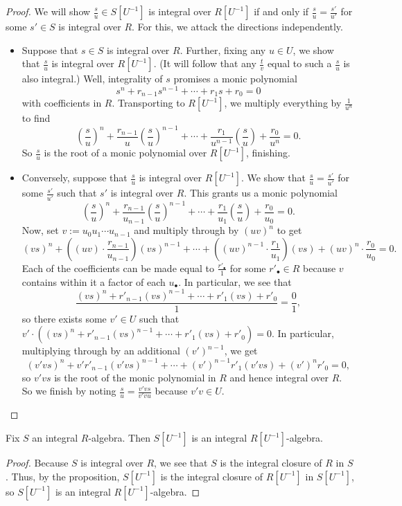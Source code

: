 \begin{proof}
	We will show $\frac su\in S\left[U^{-1}\right]$ is integral over $R\left[U^{-1}\right]$ if and only if $\frac su=\frac{s'}{u'}$ for some $s'\in S$ is integral over $R$. For this, we attack the directions independently.
	\begin{itemize}
		\item Suppose that $s\in S$ is integral over $R$. Further, fixing any $u\in U$, we show that $\frac su$ is integral over $R\left[U^{-1}\right]$. (It will follow that any $\frac tv$ equal to such a $\frac su$ is also integral.) Well, integrality of $s$ promises a monic polynomial
		\[s^n+r_{n-1}s^{n-1}+\cdots+r_1s+r_0=0\]
		with coefficients in $R$. Transporting to $R\left[U^{-1}\right]$, we multiply everything by $\frac1{u^n}$ to find
		\[\left(\frac su\right)^n+\frac{r_{n-1}}u\left(\frac su\right)^{n-1}+\cdots+\frac{r_1}{u^{n-1}}\left(\frac su\right)+\frac{r_0}{u^n}=0.\]
		So $\frac su$ is the root of a monic polynomial over $R\left[U^{-1}\right]$, finishing.
		\item Conversely, suppose that $\frac su$ is integral over $R\left[U^{-1}\right]$. We show that $\frac su=\frac{s'}{u'}$ for some $\frac{s'}{u'}$ such that $s'$ is integral over $R$. This grants us a monic polynomial
		\[\left(\frac su\right)^n+\frac{r_{n-1}}{u_{n-1}}\left(\frac su\right)^{n-1}+\cdots+\frac{r_1}{u_1}\left(\frac su\right)+\frac{r_0}{u_0}=0.\]
		Now, set $v:=u_0u_1\cdots u_{n-1}$ and multiply through by $(uv)^n$ to get
		\[(vs)^n+\left((uv)\cdot\frac{r_{n-1}}{u_{n-1}}\right)(vs)^{n-1}+\cdots+\left((uv)^{n-1}\cdot\frac{r_1}{u_1}\right)(vs)+(uv)^n\cdot\frac{r_0}{u_0}=0.\]
		Each of the coefficients can be made equal to $\frac{r'_\bullet}1$ for some $r'_\bullet\in R$ because $v$ contains within it a factor of each $u_\bullet$. In particular, we see that
		\[\frac{(vs)^n+r'_{n-1}(vs)^{n-1}+\cdots+r'_1(vs)+r'_0}1=\frac01,\]
		so there exists some $v'\in U$ such that $v'\cdot\left((vs)^n+r'_{n-1}(vs)^{n-1}+\cdots+r'_1(vs)+r'_0\right)=0$. In particular, multiplying through by an additional $(v')^{n-1}$, we get
		\[(v'vs)^n+v'r'_{n-1}(v'vs)^{n-1}+\cdots+(v')^{n-1}r'_1(v'vs)+(v')^nr'_0=0,\]
		so $v'vs$ is the root of the monic polynomial in $R$ and hence integral over $R$. So we finish by noting $\frac su=\frac{v'vs}{v'vu}$ because $v'v\in U$.
		\qedhere
	\end{itemize}
\end{proof}
\begin{corollary} \label{cor:localizeintegral}
	Fix $S$ an integral $R$-algebra. Then $S\left[U^{-1}\right]$ is an integral $R\left[U^{-1}\right]$-algebra.
\end{corollary}
\begin{proof}
	Because $S$ is integral over $R$, we see that $S$ is the integral closure of $R$ in $S$. Thus, by the proposition, $S\left[U^{-1}\right]$ is the integral closure of $R\left[U^{-1}\right]$ in $S\left[U^{-1}\right]$, so $S\left[U^{-1}\right]$ is an integral $R\left[U^{-1}\right]$-algebra.
\end{proof}

